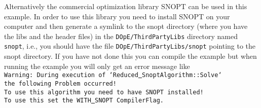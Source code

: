 Alternatively the commercial optimization library SNOPT can be used in this example.
In order to use this library you need to install SNOPT on your computer and then generate a symlink to 
the snopt directory (where you have the libs and the header files) 
in the {\tt DOpE/ThirdPartyLibs} directory named {\tt snopt}, i.e., you should have the file
{\tt DOpE/ThirdPartyLibs/snopt} pointing to the snopt directory. If you have not done this you can compile the
example but when running the example you will only get an error message like\\
{\tt Warning: During execution of `Reduced\underline{ }SnoptAlgorithm::Solve`\\ the following Problem occurred!\\
To use this algorithm you need to have SNOPT installed! \\To use this set the WITH\underline{ }SNOPT CompilerFlag.} 
